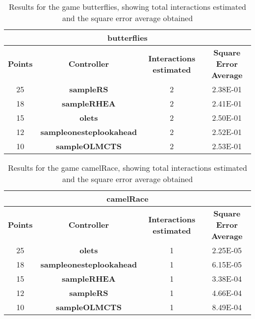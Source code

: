\begin{table*}[!t]
\begin{center}
\begin{adjustbox}{width=1\textwidth}
\begin{tabular}{|c|c|c|c|}
\hline
\multicolumn{4}{|c|}{\textbf{butterflies}}\\
\hline
\textbf{Points} & \textbf{Controller} & \textbf{Interactions estimated} & \textbf{Square Error Average}\\
\hline
25 & \textbf{sampleRS} & 2 & 2.38E-01
 \\
\hline
18 & \textbf{sampleRHEA} & 2 & 2.41E-01
 \\
\hline
15 & \textbf{olets} & 2 & 2.50E-01
 \\
\hline
12 & \textbf{sampleonesteplookahead} & 2 & 2.52E-01
 \\
\hline
10 & \textbf{sampleOLMCTS} & 2 & 2.53E-01
 \\
\hline
\end{tabular}
\end{adjustbox}
\caption{Results for the game butterflies, showing total interactions estimated and the square error average obtained}
\label{tab:weights}
\end{center}
\end{table*}
\begin{table*}[!t]
\begin{center}
\begin{adjustbox}{width=1\textwidth}
\begin{tabular}{|c|c|c|c|}
\hline
\multicolumn{4}{|c|}{\textbf{camelRace}}\\
\hline
\textbf{Points} & \textbf{Controller} & \textbf{Interactions estimated} & \textbf{Square Error Average}\\
\hline
25 & \textbf{olets} & 1 & 2.25E-05
 \\
\hline
18 & \textbf{sampleonesteplookahead} & 1 & 6.15E-05
 \\
\hline
15 & \textbf{sampleRHEA} & 1 & 3.38E-04
 \\
\hline
12 & \textbf{sampleRS} & 1 & 4.66E-04
 \\
\hline
10 & \textbf{sampleOLMCTS} & 1 & 8.49E-04
 \\
\hline
\end{tabular}
\end{adjustbox}
\caption{Results for the game camelRace, showing total interactions estimated and the square error average obtained}
\label{tab:weights}
\end{center}
\end{table*}
